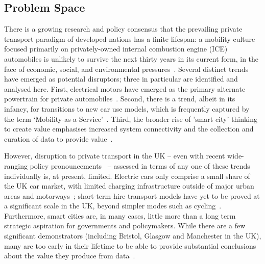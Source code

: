 \documentclass[b5paper,10pt]{article}
\begin{document}
\subsection{Problem Space}

There is a growing research and policy consensus that the prevailing
private transport paradigm of developed nations has a finite lifespan:
a mobility culture focused primarily on privately-owned internal
combustion engine (ICE) automobiles is unlikely to survive the next
thirty years in its current form, in the face of economic, social, and
environmental
pressures~\citep{lerner:2011,van-audenhove-et-al:2014,black-et-al:2016}.
Several distinct trends have emerged as potential disruptors; three in
particular are identified and analysed here. First, electrical motors
have emerged as the primary alternate powertrain for private
automobiles~\citep{paffumi-et-al:2015,gnann-et-al:2015}.  Second,
there is a trend, albeit in its infancy, for transitions to new car
use models, which is frequently captured by the term
`Mobility-as-a-Service'~\citep{tscatapult:2016}. Third, the broader
rise of 'smart city' thinking to create value emphasises increased
system connectivity and the collection and curation of data to provide
value~\citep{townsend:2013,cosgrave-et-al:2013,ibm:2014}.

However, disruption to private transport in the UK -- even with recent
wide-ranging policy pronouncements~\citep{bbcnews:2017} -- assessed in
terms of any one of these trends individually is, at present,
limited. Electric cars only comprise a small share of the UK car
market, with limited charging infrastructure outside of major urban
areas and motorways~\citep{brook:2015}; short-term hire transport
models have yet to be proved at a significant scale in the UK, beyond
simpler modes such as
cycling~\citep{kamargianni-et-al:2016}. Furthermore, smart cities are,
in many cases, little more than a long term strategic aspiration for
governments and policymakers. While there are a few significant
demonstrators (including Bristol, Glasgow and Manchester in the UK),
many are too early in their lifetime to be able to provide substantial
conclusions about the value they produce from
data~\citep{ojo-et-al:2015,sta:2017}.
\end{document}
